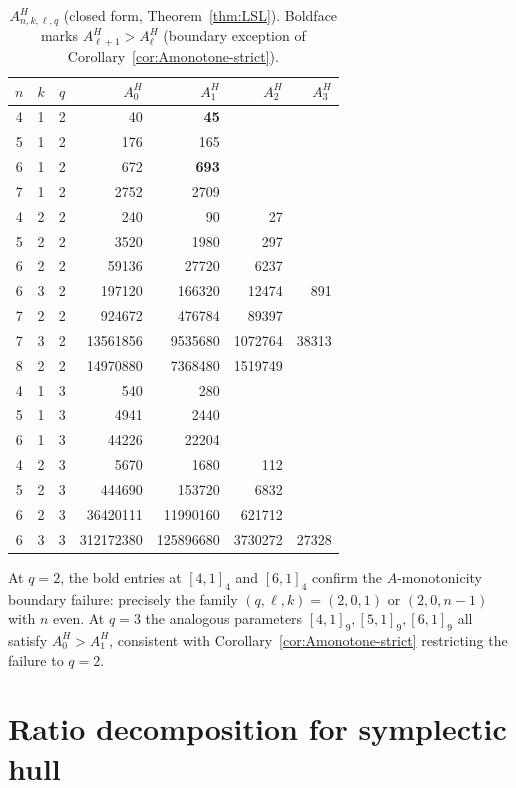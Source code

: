 \documentclass[10pt,a4paper]{amsart}
\begin{document}
\begin{table}[h]
\centering
\caption{$A^H_{n,k,\ell,q}$ (closed form, Theorem~\ref{thm:LSL}).
Boldface marks $A^H_{\ell+1} > A^H_\ell$ (boundary exception of
Corollary~\ref{cor:Amonotone-strict}).}
\label{tab:hermitian-A}
\begin{tabular}{ccc|rrrr}
\toprule
$n$ & $k$ & $q$ & $A^H_0$ & $A^H_1$ & $A^H_2$ & $A^H_3$ \\
\midrule
4 & 1 & 2 & 40 & \textbf{45} &  & \\
5 & 1 & 2 & 176 & 165 &  & \\
6 & 1 & 2 & 672 & \textbf{693} &  & \\
7 & 1 & 2 & 2752 & 2709 &  & \\
4 & 2 & 2 & 240 & 90 & 27 & \\
5 & 2 & 2 & 3520 & 1980 & 297 & \\
6 & 2 & 2 & 59136 & 27720 & 6237 & \\
6 & 3 & 2 & 197120 & 166320 & 12474 & 891 \\
7 & 2 & 2 & 924672 & 476784 & 89397 & \\
7 & 3 & 2 & 13561856 & 9535680 & 1072764 & 38313 \\
8 & 2 & 2 & 14970880 & 7368480 & 1519749 & \\
\midrule
4 & 1 & 3 & 540 & 280 &  & \\
5 & 1 & 3 & 4941 & 2440 &  & \\
6 & 1 & 3 & 44226 & 22204 &  & \\
4 & 2 & 3 & 5670 & 1680 & 112 & \\
5 & 2 & 3 & 444690 & 153720 & 6832 & \\
6 & 2 & 3 & 36420111 & 11990160 & 621712 & \\
6 & 3 & 3 & 312172380 & 125896680 & 3730272 & 27328 \\
\bottomrule
\end{tabular}
\end{table}

At $q = 2$, the bold entries at $[4,1]_4$ and $[6,1]_4$ confirm the
$A$-monotonicity boundary failure: precisely the family
$(q, \ell, k) = (2, 0, 1)$ or $(2, 0, n-1)$ with $n$ even. At $q = 3$ the
analogous parameters $[4,1]_9, [5,1]_9, [6,1]_9$ all satisfy
$A^H_0 > A^H_1$, consistent with Corollary~\ref{cor:Amonotone-strict}
restricting the failure to $q = 2$.

\section{Ratio decomposition for symplectic hull}\label{sec:symp}
\end{document}
